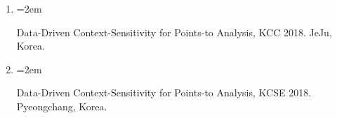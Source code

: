 \documentclass{scrartcl}
\newcommand{\MarginText}[1]{\marginpar{\raggedleft\itshape\small#1}} %
\newcommand{\Description}[1]{\hangindent=2em\hangafter=0\noindent\raggedright\footnotesize{#1}\par\normalsize\vspace{1em}} %
\begin{document}
\begin{cv}{}
\begin{enumerate}
\item{\Description{Data-Driven Context-Sensitivity for Points-to Analysis, KCC 2018. JeJu, Korea.}}

\item{\Description{Data-Driven Context-Sensitivity for Points-to Analysis, KCSE 2018. Pyeongchang, Korea.}}

\end{enumerate}


















\end{cv}
\end{document}
